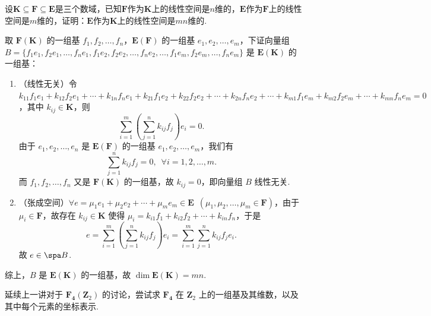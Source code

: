 \begin{exercise}
\begin{exgroup}
\begin{answer}
        \end{answer}

        \item 设$\mathbf{K} \subseteq \mathbf{F} \subseteq \mathbf{E}$是三个数域，已知$\mathbf{F}$作为$\mathbf{K}$上的线性空间是$n$维的，$\mathbf{E}$作为$\mathbf{F}$上的线性空间是$m$维的，证明：$\mathbf{E}$作为$\mathbf{K}$上的线性空间是$mn$维的.
        \begin{answer}
            取 $\mathbf{F}(\mathbf{K})$ 的一组基 $f_1, f_2, \ldots, f_n$，$\mathbf{E}(\mathbf{F})$ 的一组基 $e_1, e_2, \ldots, e_m$，下证向量组 $B = \{f_1 e_1, f_2 e_1, \ldots, f_n e_1, f_1 e_2, f_2 e_2, \ldots, f_n e_2, \ldots, f_1 e_m, f_2 e_m, \ldots, f_n e_m\}$ 是 $\mathbf{E}(\mathbf{K})$ 的一组基：

            \begin{enumerate}
                \item （线性无关）令 $k_{11} f_1 e_1 + k_{12} f_2 e_1 + \cdots + k_{1n} f_n e_1 + k_{21} f_1 e_2 + k_{22} f_2 e_2 + \cdots + k_{2n} f_n e_2 + \cdots + k_{m1} f_1 e_m + k_{m2} f_2 e_m + \cdots + k_{mn} f_n e_m = 0$，其中 $k_{ij} \in \mathbf{K}$，则
                    \[
                        \sum_{i=1}^m \left(\sum_{j=1}^n k_{ij} f_j \right) e_i = 0.
                    \]
                    由于 $e_1, e_2, \ldots, e_n$ 是 $\mathbf{E}(\mathbf{F})$ 的一组基 $e_1, e_2, \ldots, e_m$，我们有
                    \[
                        \sum_{j=1}^n k_{ij} f_j = 0, \enspace \forall i = 1, 2, \ldots, m.
                    \]
                    而 $f_1, f_2, \ldots, f_n$ 又是 $\mathbf{F}(\mathbf{K})$ 的一组基，故 $k_{ij} = 0$，即向量组 $B$ 线性无关.

                \item （张成空间）$\forall e = \mu_1 e_1 + \mu_2 e_2 + \cdots + \mu_m e_m \in \mathbf{E} \enspace (\mu_1, \mu_2, \ldots, \mu_m \in \mathbf{F})$，由于 $\mu_i \in \mathbf{F}$，故存在 $k_{ij} \in \mathbf{K}$ 使得 $\mu_i = k_{i1} f_1 + k_{i2} f_2 + \cdots + k_{in} f_n$，于是
                    \[
                        e = \sum_{i=1}^m \left(\sum_{j=1}^n k_{ij} f_j \right) e_i
                          = \sum_{i=1}^m \sum_{j=1}^n k_{ij} f_j e_i.
                    \]
                    故 $e \in \spa B$.
            \end{enumerate}
            综上，$B$ 是 $\mathbf{E}(\mathbf{K})$ 的一组基，故 $\dim \mathbf{E}(\mathbf{K}) = mn$.
        \end{answer}

        \item 延续上一讲对于 $\mathbf{F_4}(\mathbf{Z}_2)$ 的讨论，尝试求 $\mathbf{F_4}$ 在 $\mathbf{Z}_2$ 上的一组基及其维数，以及其中每个元素的坐标表示.
        \begin{answer}

        \end{answer}
    \end{exgroup}
\end{exercise}
